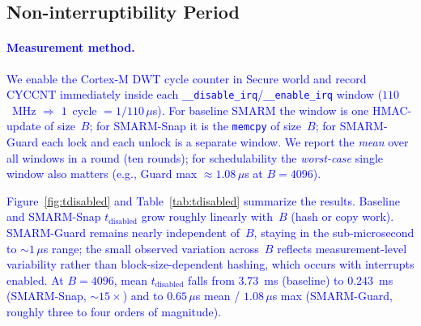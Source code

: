 \documentclass[conference]{IEEEtran}
\newcommand{\tdis}{$t_{\mathrm{disabled}}$\xspace}
\newcommand{\smarmcopy}{SMARM-Snap\xspace}
\newcommand{\smarmlock}{SMARM-Guard\xspace}
\newcommand\ben[1]{\textcolor{blue}{#1}}
\begin{document}
\subsection{Non-interruptibility Period}

%
%
%

\paragraph{\ben{Measurement method.}}
\ben{We enable the Cortex-M DWT cycle counter in Secure world and record $\mathrm{CYCCNT}$ immediately inside each \texttt{\_\_disable\_irq}/\texttt{\_\_enable\_irq} window ($110$~MHz $\Rightarrow$ $1$~cycle $=1/110\,\mu$s). For baseline SMARM the window is one HMAC-update of size~$B$; for \smarmcopy{} it is the \texttt{memcpy} of size~$B$; for \smarmlock{} each lock and each unlock is a separate window. We report the \emph{mean} over all windows in a round (ten rounds); for schedulability the \emph{worst-case} single window also matters (e.g., Guard max $\approx 1.08\,\mu$s at $B{=}4096$).}

\ben{Figure~\ref{fig:tdisabled} and Table~\ref{tab:tdisabled} summarize the results. Baseline and \smarmcopy{} \tdis{} grow roughly linearly with~$B$ (hash or copy work). \smarmlock{} remains nearly independent of~$B$, staying in the sub-microsecond to $\sim\!\!1\,\mu$s range; the small observed variation across~$B$ reflects measurement-level variability rather than block-size-dependent hashing, which occurs with interrupts enabled. At $B{=}4096$, mean \tdis{} falls from $3.73$~ms (baseline) to $0.243$~ms (\smarmcopy{}, $\sim\!\!15\times$) and to $0.65\,\mu$s mean / $1.08\,\mu$s max (\smarmlock{}, roughly three to four orders of magnitude).}
\end{document}
